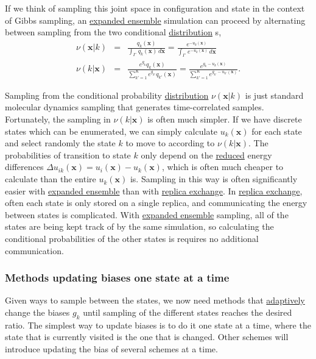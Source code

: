 \documentclass[9pt,review]{livecoms}
\newcommand{\vx}{\mathbf{x}}
\begin{document}
If we think of sampling this joint space in configuration and state in the context of Gibbs sampling, an \hyperlink{ref:ExpEns} {expanded ensemble} simulation can proceed by alternating between sampling from the two conditional \hyperlink{ref:Distribution} {distribution} s,
\begin{eqnarray}
\nu(\vx | k) &=& \frac{q_k(\vx)}{\int_\Gamma  \, q_k(\vx) \, d\vx}  = \frac{e^{-u_k(\vx)}}{\int_\Gamma  \, e^{-u_k(\vx)} \, d\vx }  \\
\nu(k | \vx) &=& \frac{e^{g_k}q_k(\vx)}{\sum\limits_{k'=1}^K e^{g_{k'}}q_{k'}(\vx)} = \frac{e^{g_k - u_k(\vx)}}{\sum\limits_{k'=1}^K e^{g_{k'} - u_{k'}(\vx)}} .\label{equation:expanded-ensemble-gibbs-update}
\end{eqnarray}

Sampling from the conditional probability \hyperlink{ref:Distribution} {distribution} 
$\nu(\vx | k)$ is just standard molecular dynamics sampling that generates time-correlated samples. Fortunately, the sampling in $\nu(k | \vx)$ is often much simpler.   If we have
discrete states which can be enumerated, we can simply calculate
$u_k(\vx)$ for each state and select randomly the state $k$ to move to according to $\nu(k|\vx)$.  The
probabilities of transition to state $k$ only depend on the \hyperlink{ref:reduced} {reduced} energy differences $\Delta
u_{ik}(\vx) = u_i(\vx) - u_k(\vx)$, which is often much cheaper to calculate
than the entire $u_k(\vx)$ is. Sampling in this way is often significantly easier with \hyperlink{ref:ExpEns} {expanded ensemble} than with \hyperlink{ref:ReplEx} {replica exchange}. In \hyperlink{ref:ReplEx} {replica exchange}, often each state is only stored on a single replica, and communicating the energy between states is complicated. With \hyperlink{ref:ExpEns} {expanded ensemble} sampling, all of the states are being kept track of by the same simulation, so calculating the conditional probabilities of the other states is requires no additional communication.

\subsubsection{\label{sec:singlestate} Methods updating biases one state at a time}
Given ways to sample between the states, we now need methods that \hyperlink{ref:Adaptive} {adaptively} change the biases $g_k$ until sampling of the different states reaches the desired ratio. The simplest way to update biases is to do it one state at a time, where the state that is currently visited is the one that is changed. Other schemes will introduce updating the bias of several schemes at a time.
\end{document}
